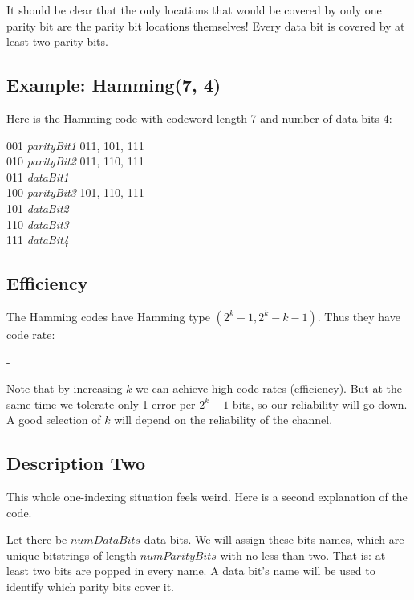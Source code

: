 \documentclass[11pt, oneside]{amsart}
\begin{document}
It should be clear that the only locations that would be covered by only
one parity bit are the parity bit locations themselves! Every data bit
is covered by at least two parity bits.

\subsection{Example: Hamming(7, 4)}

Here is the Hamming code with codeword length 7 and number of data bits
4:

\begin{nedqn}
  001 \mapstocol \textit{parityBit1}  011, 101, 111
\\
  010 \mapstocol \textit{parityBit2}  011, 110, 111
\\
  011 \mapstocol \textit{dataBit1}
\\
  100 \mapstocol \textit{parityBit3}  101, 110, 111
\\
  101 \mapstocol \textit{dataBit2}
\\
  110 \mapstocol \textit{dataBit3}
\\
  111 \mapstocol \textit{dataBit4}
\end{nedqn}

\subsection{Efficiency}

The Hamming codes have Hamming type $(2^k - 1, 2^k - k - 1)$. Thus they
have code rate:

\begin{nedqn}
 - 
\end{nedqn}

Note that by increasing $k$ we can achieve high code rates (efficiency).
But at the same time we tolerate only 1 error per $2^k - 1$ bits, so our
reliability will go down. A good selection of $k$ will depend on the
reliability of the channel.

\subsection{Description Two}

This whole one-indexing situation feels weird. Here is a second
explanation of the code.

Let there be $\textit{numDataBits}$ data bits. We will assign these bits
names, which are unique bitstrings of length $\textit{numParityBits}$
with  no less than two. That is: at least two
bits are popped in every name. A data bit's name will be used to
identify which parity bits cover it.
\end{document}
